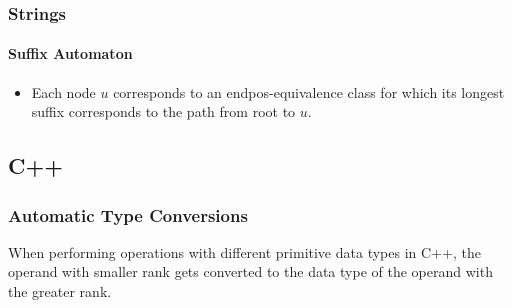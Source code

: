 \documentclass[twoside]{article}
\newcommand{\fileTitleStyle}{\large\underline}
\begin{document}
\subsubsection*{Strings}
\vspace{2em}
\paragraphfont{\centering\bfseries\large}
\paragraphfont{\fileTitleStyle}
\paragraph*{Suffix Automaton}
\vspace{1em}
\sffamily
\begin{itemize}[label={\bullet}]
  \item Each node $u$ corresponds to an endpos-equivalence class for which its longest suffix corresponds to the path from root to $u$.
\end{itemize}
\begin{multicols*}{2}
\end{multicols*}
\subsectionfont{\centering\bfseries\LARGE}
\vspace{0em}
\subsection*{C++}
\vspace{2em}
\subsubsectionfont{\centering\bfseries\Large}
\subsubsectionfont{\fileTitleStyle}
\subsubsection*{Automatic Type Conversions}
\vspace{1em}
\sffamily

When performing operations with different primitive data types in C++,
the operand with smaller rank gets converted to the data type of the operand
with the greater rank.
\end{document}
